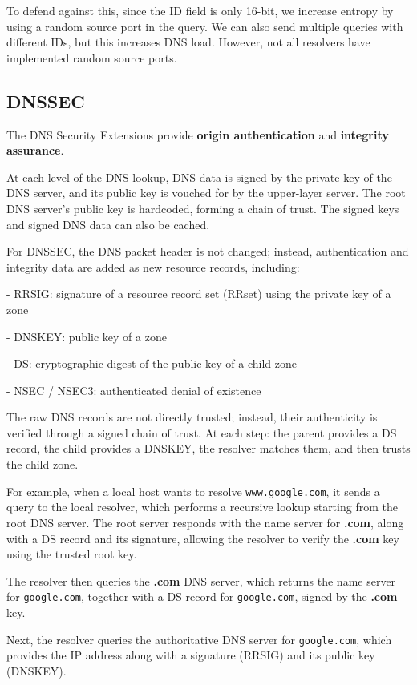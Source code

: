 To defend against this, since the ID field is only 16-bit, we increase entropy by using a random source port in the query. We can also send multiple queries with different IDs, but this increases DNS load. However, not all resolvers have implemented random source ports.

\subsection{DNSSEC}
The DNS Security Extensions provide \textbf{origin authentication} and \textbf{integrity assurance}. 

At each level of the DNS lookup, DNS data is signed by the private key of the DNS server, and its public key is vouched for by the upper-layer server. The root DNS server's public key is hardcoded, forming a chain of trust. The signed keys and signed DNS data can also be cached. 

For DNSSEC, the DNS packet header is not changed; instead, authentication and integrity data are added as new resource records, including:

- RRSIG: signature of a resource record set (RRset) using the private key of a zone  

- DNSKEY: public key of a zone  

- DS: cryptographic digest of the public key of a child zone  

- NSEC / NSEC3: authenticated denial of existence  

The raw DNS records are not directly trusted; instead, their authenticity is verified through a signed chain of trust. At each step: the parent provides a DS record, the child provides a DNSKEY, the resolver matches them, and then trusts the child zone.  

For example, when a local host wants to resolve \texttt{www.google.com}, it sends a query to the local resolver, which performs a recursive lookup starting from the root DNS server. The root server responds with the name server for \textbf{.com}, along with a DS record and its signature, allowing the resolver to verify the \textbf{.com} key using the trusted root key.  

The resolver then queries the \textbf{.com} DNS server, which returns the name server for \texttt{google.com}, together with a DS record for \texttt{google.com}, signed by the \textbf{.com} key.  

Next, the resolver queries the authoritative DNS server for \texttt{google.com}, which provides the IP address along with a signature (RRSIG) and its public key (DNSKEY).  


